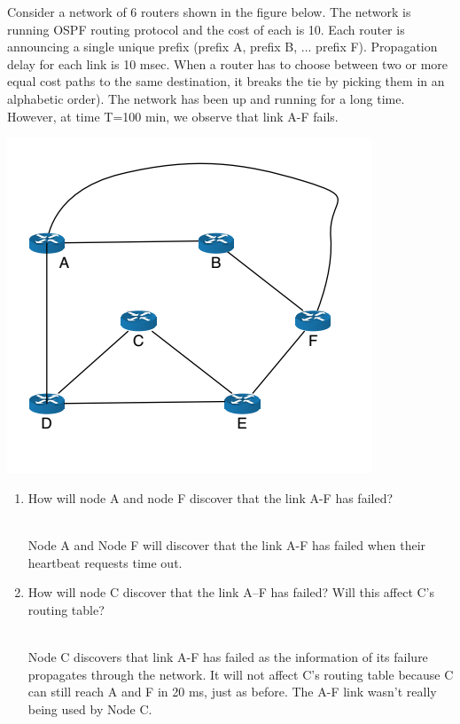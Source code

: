 \documentclass{report}
\begin{document}
\clearpage
\begin{problem}
Consider a network of 6 routers shown in the figure below. The network is running OSPF routing protocol and the cost of each is 10. Each router is announcing a single unique prefix (prefix A, prefix B, ... prefix F). Propagation delay for each link is 10 msec. When a router has to choose between two or more equal cost paths to
the same destination, it breaks the tie by picking them in an alphabetic order). The network has been up and running for a long time. However, at time T=100 min, we observe that
link A-F fails.

\begin{center}
\includegraphics[scale=0.5]{hw7-ospf.png}
\end{center}
\begin{enumerate}
\item How will node A and node F discover that the link A-F has failed? \\ \\

\begin{answer}{5em}
Node A and Node F will discover that the link A-F has failed when their
heartbeat requests time out.
\end{answer}

\item How will node C discover that the link A–F has failed? Will this affect C's routing table? \\ \\

\begin{answer}{5em}
  Node C discovers that link A-F has failed as the information of its failure
  propagates through the network. It will not affect C's routing table because
  C can still reach A and F in 20 ms, just as before. The A-F link wasn't really
  being used by Node C.
\end{answer}


\end{enumerate}
\end{problem}
\end{document}
